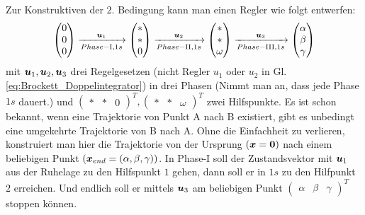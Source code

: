 \begin{beispiel}
  	Zur Konstruktiven der $2.$ Bedingung kann man einen Regler wie folgt entwerfen:
	  \begin{eqnarray}
	  	\begin{pmatrix}
	  	0\\ 
	  	0\\ 
	  	0
	  	\end{pmatrix}\xrightarrow[Phase-\textrm{I}, 1s]{\boldsymbol u_{1}}\begin{pmatrix}
	  	\ast \\ 
	  	\ast \\ 
	  	0
	  	\end{pmatrix}\xrightarrow[Phase-\textrm{II}, 1s]{\boldsymbol u_{2}}\begin{pmatrix}
	  	\ast \\ 
	  	\ast \\ 
	  	\omega 
	  	\end{pmatrix}\xrightarrow[Phase-\textrm{III}, 1s]{\boldsymbol u_{3}}\begin{pmatrix}
	  	\alpha\\ 
	  	\beta\\ 
	  	\gamma
	  	\end{pmatrix}
	  \end{eqnarray}
  	mit $\boldsymbol u_{1}, \boldsymbol u_{2}, \boldsymbol u_{3}$ drei Regelgesetzen (nicht Regler $u_{1}$ oder $u_{2}$ in Gl. \eqref{eq:Brockett_Doppelintegrator}) in drei Phasen (Nimmt man an, dass jede Phase $1s$ dauert.) und $\begin{pmatrix}
   \ast  & \ast  & 0
   \end{pmatrix}^{T}, \begin{pmatrix}
   \ast  & \ast  & \omega
   \end{pmatrix}^{T}$ zwei Hilfspunkte. Es ist schon bekannt, wenn eine Trajektorie von Punkt A nach B existiert, gibt es unbedingt eine umgekehrte Trajektorie von B nach A. Ohne die Einfachheit zu verlieren, konstruiert man hier die Trajektorie von der Ursprung $(\boldsymbol x=\boldsymbol 0)$ nach einem beliebigen Punkt $(\boldsymbol x_{end}=(\alpha,\beta,\gamma))$.  In Phase-$\textrm{I}$ soll der Zustandsvektor mit $\boldsymbol u_{1}$ aus der Ruhelage zu den Hilfspunkt $1$ gehen, dann soll er in $1s$ zu den Hilfpunkt $2$ erreichen. Und endlich soll er mittels $\boldsymbol u_{3}$ am beliebigen Punkt $\begin{pmatrix}
   \alpha  & \beta  &\gamma
   \end{pmatrix}^{T}$ stoppen können. 
  

\end{beispiel}
